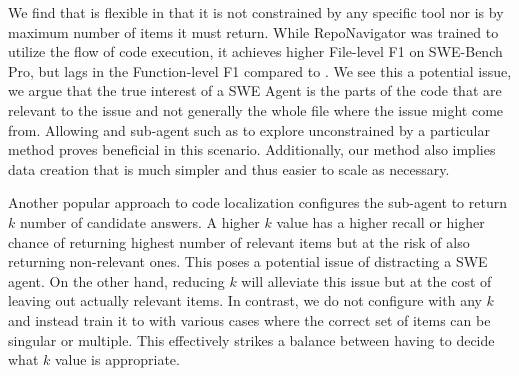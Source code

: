 We find that \methodname is flexible in that it is not constrained by any specific tool nor is by maximum number of items it must return. While RepoNavigator was trained to utilize the flow of code execution, it achieves higher File-level F1 on SWE-Bench Pro, but lags in the Function-level F1 compared to \methodname. We see this a potential issue, we argue that the true interest of a SWE Agent is the parts of the code that are relevant to the issue and not generally the whole file where the issue might come from. Allowing and sub-agent such as \methodname to explore unconstrained by a particular method proves beneficial in this scenario. Additionally, our method also implies data creation that is much simpler and thus easier to scale as necessary. 

Another popular approach to code localization configures the sub-agent to return $k$ number of candidate answers. A higher $k$ value has a higher recall or higher chance of returning highest number of relevant items but at the risk of also returning non-relevant ones. This poses a potential issue of distracting a SWE agent. On the other hand, reducing $k$ will alleviate this issue but at the cost of leaving out actually relevant items. In contrast, we do not configure \methodname with any $k$ and instead train it to with various cases where the correct set of items can be singular or multiple. This effectively strikes a balance between having to decide what $k$ value is appropriate.






